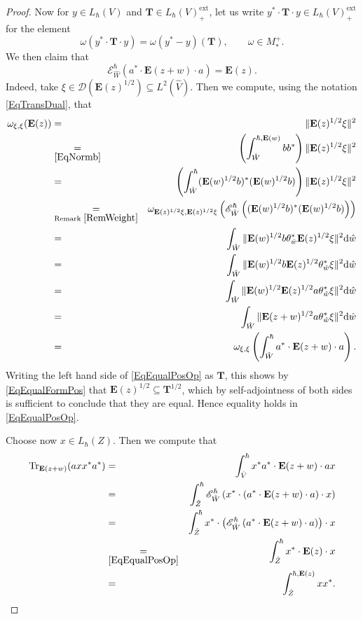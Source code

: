 \documentclass[11pt, reqno]{amsart}
\theoremstyle{definition}
\numberwithin{equation}{section}
\def\msD{\mathscr D}
\newcommand{\eb}{\mathbf{E}}
\newcommand{\rd}{\mathrm{d}\!\,}
\newcommand{\Eb}{\mathbf{E}}
\newcommand{\Tr}{\mathrm{Tr}}
\newcommand{\ext}{\mathrm{ext}}
\newcommand{\Tb}{\mathbf{T}}
\newcommand{\msE}{\mathscr{E}}
\begin{document}
\begin{proof}
Now for $y \in L_{\hbar}(V)$ and $\Tb \in L_{\hbar}(V)_+^{\ext}$, let us write $y^*\cdot \Tb \cdot y \in L_{\hbar}(V)_+^{\ext}$ for the element 
\[
\omega(y^*\cdot \Tb\cdot y) = \omega(y^*-y)(\Tb),\qquad \omega \in M_*^+.
\]
We then claim that 
\begin{equation}\label{EqEqualPosOp}
\msE_{\hat{W}}^{\hbar}(a^*\cdot \eb(z+w)\cdot a) = \eb(z). 
\end{equation}
Indeed, take $\xi \in \msD(\eb(z)^{1/2}) \subseteq L^2(\hat{V})$. Then we compute, using the notation \eqref{EqTransDual}, that
\begin{eqnarray}
\omega_{\xi,\xi}(\eb(z)) 
&=& \|\eb(z)^{1/2}\xi\|^2 \\
&\underset{\eqref{EqNormb}}{=}&
\left(\int_{\hat{W}}^{\hbar,\Eb(w)} bb^*\right) \|\eb(z)^{1/2}\xi\|^2\\
&=& \left(\int_{\hat{W}}^{\hbar} (\Eb(w)^{1/2}b)^*(\Eb(w)^{1/2}b)\right)  \|\eb(z)^{1/2}\xi\|^2\\
&\underset{\textrm{Remark } \ref{RemWeight}}{=}& 
\omega_{\Eb(z)^{1/2}\xi,\Eb(z)^{1/2}\xi}\left(\msE_{\hat{W}}^{\hbar} \left((\Eb(w)^{1/2}b)^*(\Eb(w)^{1/2}b)\right) \right)\\
&=& \int_{\hat{W}} \|\Eb(w)^{1/2}b\theta_{\hat{w}}^* \eb(z)^{1/2}\xi\|^2\rd \hat{w}\\
&=& \int_{\hat{W}} \|\Eb(w)^{1/2}b \eb(z)^{1/2}\theta_{\hat{w}}^*\xi\|^2\rd \hat{w}\\
 &=& \int_{\hat{W}} \|\Eb(w)^{1/2} \Eb(z)^{1/2}a \theta_{\hat{w}}^*\xi\|^2 \rd\hat{w} \\
 &=& \int_{\hat{W}} \| \Eb(z+w)^{1/2}a \theta_{\hat{w}}^*\xi\|^2 \rd\hat{w} \\
&=& 
\omega_{\xi,\xi}\left(\int_{\hat{W}}^{\hbar} a^*\cdot \eb(z+w)\cdot a\right).
\end{eqnarray}
Writing the left hand side of \eqref{EqEqualPosOp} as $\Tb$, this shows by \eqref{EqEqualFormPos} that $\Eb(z)^{1/2} \subseteq \Tb^{1/2}$, which by self-adjointness of both sides is sufficient to conclude that they are equal. Hence equality holds in \eqref{EqEqualPosOp}.




Choose now $x\in L_{\hbar}(Z)$. Then we compute that 
\begin{eqnarray*}
\Tr_{\Eb(z+w)}(axx^*a^*) &=& \int_{\hat{V}}^{\hbar} x^*a^* \cdot  \eb(z+w)\cdot ax\\
&=& \int_{\hat{Z}}^{\hbar} \msE_{\hat{W}}^{\hbar} \left(x^*\cdot (a^* \cdot \eb(z+w)\cdot a)\cdot x\right)\\
&=& \int_{\hat{Z}}^{\hbar}x^*\cdot \left( \msE_{\hat{W}}^{\hbar} \left( a^*\cdot \eb(z+w)\cdot a\right)\right)\cdot x\\
&\underset{\eqref{EqEqualPosOp}}{=}& \int_{\hat{Z}}^{\hbar}x^*\cdot \eb(z)\cdot x\\
&=& \int_{\hat{Z}}^{\hbar,\Eb(z)}xx^*.
\end{eqnarray*} 
\end{proof}
\end{document}
